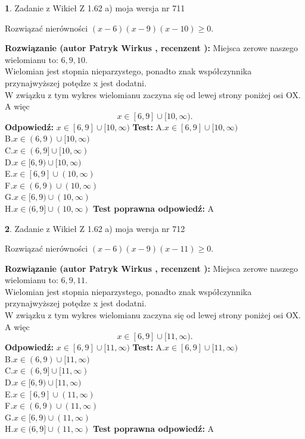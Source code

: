 \documentclass[12pt, a4paper]{article}
\theoremstyle{definition} %
\newtheorem{zad}{}
\newcommand{\zadStart}[1]{\begin{zad}#1\newline}
\newcommand{\zadStop}{\end{zad}}
\newcommand{\rozwStart}[2]{\noindent \textbf{Rozwiązanie (autor #1 , recenzent #2): }\newline}
\newcommand{\rozwStop}{\newline}
\newcommand{\odpStart}{\noindent \textbf{Odpowiedź:}\newline}
\newcommand{\odpStop}{\newline}
\newcommand{\testStart}{\noindent \textbf{Test:}\newline}
\newcommand{\testStop}{\newline}
\newcommand{\kluczStart}{\noindent \textbf{Test poprawna odpowiedź:}\newline}
\newcommand{\kluczStop}{\newline}
\begin{document}
\zadStart{Zadanie z Wikieł Z 1.62 a) moja wersja nr 711}

Rozwiązać nierówności $(x-6)(x-9)(x-10)\ge0$.
\zadStop
\rozwStart{Patryk Wirkus}{}
Miejsca zerowe naszego wielomianu to: $6, 9, 10$.\\
Wielomian jest stopnia nieparzystego, ponadto znak współczynnika przy\linebreak najwyższej potędze x jest dodatni.\\ W związku z tym wykres wielomianu zaczyna się od lewej strony poniżej osi OX. A więc $$x \in [6,9] \cup [10,\infty).$$
\rozwStop
\odpStart
$x \in [6,9] \cup [10,\infty)$
\odpStop
\testStart
A.$x \in [6,9] \cup [10,\infty)$\\
B.$x \in (6,9) \cup [10,\infty)$\\
C.$x \in (6,9] \cup [10,\infty)$\\
D.$x \in [6,9) \cup [10,\infty)$\\
E.$x \in [6,9] \cup (10,\infty)$\\
F.$x \in (6,9) \cup (10,\infty)$\\
G.$x \in [6,9) \cup (10,\infty)$\\
H.$x \in (6,9] \cup (10,\infty)$
\testStop
\kluczStart
A
\kluczStop



\zadStart{Zadanie z Wikieł Z 1.62 a) moja wersja nr 712}

Rozwiązać nierówności $(x-6)(x-9)(x-11)\ge0$.
\zadStop
\rozwStart{Patryk Wirkus}{}
Miejsca zerowe naszego wielomianu to: $6, 9, 11$.\\
Wielomian jest stopnia nieparzystego, ponadto znak współczynnika przy\linebreak najwyższej potędze x jest dodatni.\\ W związku z tym wykres wielomianu zaczyna się od lewej strony poniżej osi OX. A więc $$x \in [6,9] \cup [11,\infty).$$
\rozwStop
\odpStart
$x \in [6,9] \cup [11,\infty)$
\odpStop
\testStart
A.$x \in [6,9] \cup [11,\infty)$\\
B.$x \in (6,9) \cup [11,\infty)$\\
C.$x \in (6,9] \cup [11,\infty)$\\
D.$x \in [6,9) \cup [11,\infty)$\\
E.$x \in [6,9] \cup (11,\infty)$\\
F.$x \in (6,9) \cup (11,\infty)$\\
G.$x \in [6,9) \cup (11,\infty)$\\
H.$x \in (6,9] \cup (11,\infty)$
\testStop
\kluczStart
A
\kluczStop
\end{document}
